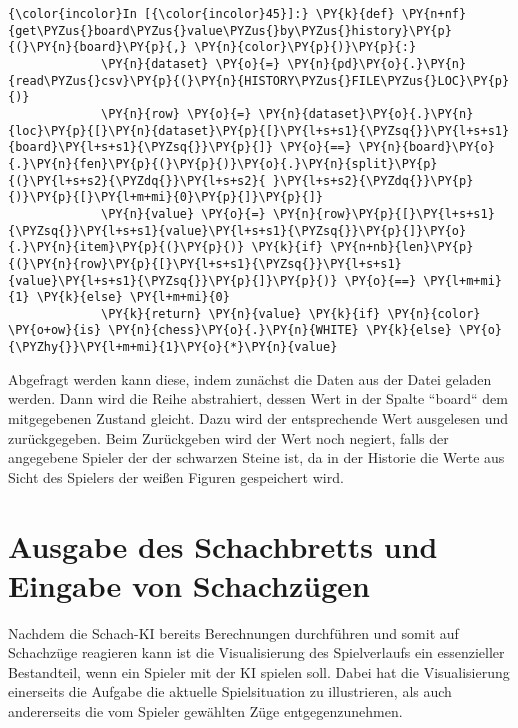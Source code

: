     \begin{Verbatim}[commandchars=\\\{\}]
{\color{incolor}In [{\color{incolor}45}]:} \PY{k}{def} \PY{n+nf}{get\PYZus{}board\PYZus{}value\PYZus{}by\PYZus{}history}\PY{p}{(}\PY{n}{board}\PY{p}{,} \PY{n}{color}\PY{p}{)}\PY{p}{:}
             \PY{n}{dataset} \PY{o}{=} \PY{n}{pd}\PY{o}{.}\PY{n}{read\PYZus{}csv}\PY{p}{(}\PY{n}{HISTORY\PYZus{}FILE\PYZus{}LOC}\PY{p}{)}
             \PY{n}{row} \PY{o}{=} \PY{n}{dataset}\PY{o}{.}\PY{n}{loc}\PY{p}{[}\PY{n}{dataset}\PY{p}{[}\PY{l+s+s1}{\PYZsq{}}\PY{l+s+s1}{board}\PY{l+s+s1}{\PYZsq{}}\PY{p}{]} \PY{o}{==} \PY{n}{board}\PY{o}{.}\PY{n}{fen}\PY{p}{(}\PY{p}{)}\PY{o}{.}\PY{n}{split}\PY{p}{(}\PY{l+s+s2}{\PYZdq{}}\PY{l+s+s2}{ }\PY{l+s+s2}{\PYZdq{}}\PY{p}{)}\PY{p}{[}\PY{l+m+mi}{0}\PY{p}{]}\PY{p}{]}
             \PY{n}{value} \PY{o}{=} \PY{n}{row}\PY{p}{[}\PY{l+s+s1}{\PYZsq{}}\PY{l+s+s1}{value}\PY{l+s+s1}{\PYZsq{}}\PY{p}{]}\PY{o}{.}\PY{n}{item}\PY{p}{(}\PY{p}{)} \PY{k}{if} \PY{n+nb}{len}\PY{p}{(}\PY{n}{row}\PY{p}{[}\PY{l+s+s1}{\PYZsq{}}\PY{l+s+s1}{value}\PY{l+s+s1}{\PYZsq{}}\PY{p}{]}\PY{p}{)} \PY{o}{==} \PY{l+m+mi}{1} \PY{k}{else} \PY{l+m+mi}{0}
             \PY{k}{return} \PY{n}{value} \PY{k}{if} \PY{n}{color} \PY{o+ow}{is} \PY{n}{chess}\PY{o}{.}\PY{n}{WHITE} \PY{k}{else} \PY{o}{\PYZhy{}}\PY{l+m+mi}{1}\PY{o}{*}\PY{n}{value}
\end{Verbatim}

    Abgefragt werden kann diese, indem zunächst die Daten aus der Datei
geladen werden. Dann wird die Reihe abstrahiert, dessen Wert in der
Spalte ``board`` dem mitgegebenen Zustand gleicht. Dazu wird der 
entsprechende Wert ausgelesen und zurückgegeben.
Beim Zurückgeben wird der Wert noch negiert, falls der angegebene
Spieler der der schwarzen Steine ist, da in der Historie die Werte aus
Sicht des Spielers der weißen Figuren gespeichert wird.

    \section{Ausgabe des Schachbretts und Eingabe von
Schachzügen}\label{ausgabe-des-schachbretts-und-eingabe-von-schachzuxfcgen}

Nachdem die Schach-KI bereits Berechnungen durchführen und somit auf
Schachzüge reagieren kann ist die Visualisierung des Spielverlaufs ein
essenzieller Bestandteil, wenn ein Spieler mit der KI spielen soll.
Dabei hat die Visualisierung einerseits die Aufgabe die aktuelle
Spielsituation zu illustrieren, als auch andererseits die vom Spieler
gewählten Züge entgegenzunehmen.

